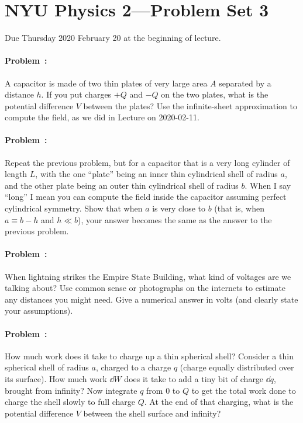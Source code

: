 \documentclass[12pt]{article}
\begin{document}
\section*{NYU Physics 2---Problem Set 3}

Due Thursday 2020 February 20 at the beginning of lecture.

\paragraph{Problem~\theproblem:}%
A capacitor is made of two thin plates of very large area $A$
separated by a distance $h$. If you put charges $+Q$ and $-Q$ on the
two plates, what is the potential difference $V$ between the plates?
Use the infinite-sheet approximation to compute the field, as we did
in Lecture on 2020-02-11.

\paragraph{Problem~\theproblem:}%
Repeat the previous problem, but for a capacitor that is a very long
cylinder of length $L$, with the one ``plate'' being an inner thin
cylindrical shell of radius $a$, and the other plate being an outer
thin cylindrical shell of radius $b$. When I say ``long'' I mean you
can compute the field inside the capacitor assuming perfect
cylindrical symmetry. Show that when $a$ is very close to $b$ (that
is, when $a \equiv b - h$ and $h \ll b$), your answer becomes the same
as the answer to the previous problem.

\paragraph{Problem~\theproblem:}%
When lightning strikes the Empire State Building, what kind of
voltages are we talking about? Use common sense or photographs on the
internets to estimate any distances you might need. Give a numerical
answer in volts (and clearly state your assumptions).

\paragraph{Problem~\theproblem:}%
How much work does it take to charge up a thin spherical shell?
Consider a thin spherical shell of radius $a$, charged to a charge
$q$ (charge equally distributed over its surface). How much work
$\dd W$ does it take to add a tiny bit of charge $\dd q$, brought
from infinity? Now integrate $q$ from $0$ to $Q$ to get the total
work done to charge the shell slowly to full charge $Q$. At the
end of that charging, what is the potential difference $V$ between
the shell surface and infinity?
\end{document}
